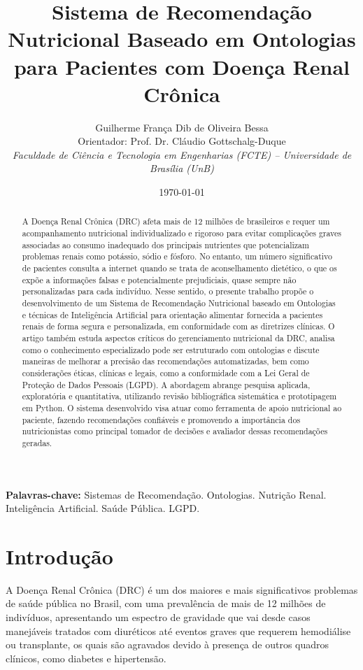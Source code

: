 \documentclass[12pt, a4paper, twocolumn]{article}
\title{\textbf{Sistema de Recomendação Nutricional Baseado em Ontologias para Pacientes com Doença Renal Crônica}}
\author{
    Guilherme França Dib de Oliveira Bessa \\
    \small Orientador: Prof. Dr. Cláudio Gottschalg-Duque \\
    \small \textit{Faculdade de Ciência e Tecnologia em Engenharias (FCTE) -- Universidade de Brasília (UnB)}
}
\date{\today}
\begin{document}
\maketitle
\begin{abstract}
A Doença Renal Crônica (DRC) afeta mais de 12 milhões de brasileiros e requer um acompanhamento nutricional individualizado e rigoroso para evitar complicações graves associadas ao consumo inadequado dos principais nutrientes que potencializam problemas renais como potássio, sódio e fósforo. No entanto, um número significativo de pacientes consulta a internet quando se trata de aconselhamento dietético, o que os expõe a informações falsas e potencialmente prejudiciais, quase sempre não personalizadas para cada indivíduo. Nesse sentido, o presente trabalho propõe o desenvolvimento de um Sistema de Recomendação Nutricional baseado em Ontologias e técnicas de Inteligência Artificial para orientação alimentar fornecida a pacientes renais de forma segura e personalizada, em conformidade com as diretrizes clínicas. O artigo também estuda aspectos críticos do gerenciamento nutricional da DRC, analisa como o conhecimento especializado pode ser estruturado com ontologias e discute maneiras de melhorar a precisão das recomendações automatizadas, bem como considerações éticas, clínicas e legais, como a conformidade com a Lei Geral de Proteção de Dados Pessoais (LGPD). A abordagem abrange pesquisa aplicada, exploratória e quantitativa, utilizando revisão bibliográfica sistemática e prototipagem em Python. O sistema desenvolvido visa atuar como ferramenta de apoio nutricional ao paciente, fazendo recomendações confiáveis e promovendo a importância dos nutricionistas como principal tomador de decisões e avaliador dessas recomendações geradas.
\end{abstract}

\vspace{0.3cm}
\noindent \textbf{Palavras-chave:} Sistemas de Recomendação. Ontologias. Nutrição Renal. Inteligência Artificial. Saúde Pública. LGPD.
\vspace{0.3cm}

\section{Introdução}

A Doença Renal Crônica (DRC) é um dos maiores e mais significativos problemas de saúde pública no Brasil, com uma prevalência de mais de 12 milhões de indivíduos, apresentando um espectro de gravidade que vai desde casos manejáveis tratados com diuréticos até eventos graves que requerem hemodiálise ou transplante, os quais são agravados devido à presença de outros quadros clínicos, como diabetes e hipertensão.
\end{document}
